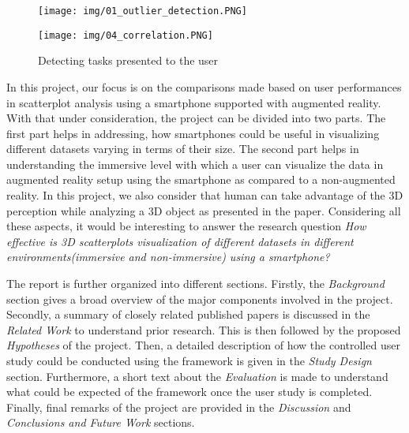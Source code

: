 \documentclass[journal]{vgtc}                %
\begin{document}
\begin{figure}[ht]
    \begin{minipage}[b]{0.45\linewidth}
        \centering
        \texttt{[image: img/01\_outlier\_detection.PNG]}
    \end{minipage}
    \hspace{0.5cm}
    \begin{minipage}[b]{0.45\linewidth}
        \centering
        \texttt{[image: img/04\_correlation.PNG]}
    \end{minipage}
    \caption{Detecting tasks presented to the user}
\end{figure}

In this project, our focus is on the comparisons made based on user performances in scatterplot analysis using a smartphone supported with augmented reality. With that under consideration, the project can be divided into two parts. The first part helps in addressing, how smartphones could be useful in visualizing different datasets varying in terms of their size. The second part helps in understanding the immersive level with which a user can visualize the data in augmented reality setup using the smartphone as compared to a non-augmented reality. In this project, we also consider that human can take advantage of the 3D perception while analyzing a 3D object as presented in the paper\cite{cliquet2017towards}. Considering all these aspects, it would be interesting to answer the research question \textit{How effective is 3D scatterplots visualization of different datasets in different environments(immersive and non-immersive) using a smartphone?}

The report is further organized into different sections. Firstly, the \textit{Background} section gives a broad overview of the major components involved in the project.  Secondly, a summary of closely related published papers is discussed in the \textit{Related Work} to understand prior research. This is then followed by the proposed \textit{Hypotheses} of the project. Then, a detailed description of how the controlled user study could be conducted using the framework is given in the \textit{Study Design} section. Furthermore, a short text about the \textit{Evaluation} is made to understand what could be expected of the framework once the user study is completed. Finally, final remarks of the project are provided in the \textit{Discussion} and \textit{Conclusions and Future Work} sections.
\end{document}
